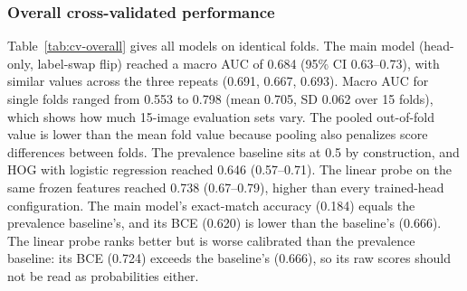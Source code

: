 \documentclass[11pt]{article}
\begin{document}
\subsubsection*{Overall cross-validated performance}
Table~\ref{tab:cv-overall} gives all models on identical folds. The main model (head-only, label-swap flip) reached a macro AUC of 0.684 (95\% CI 0.63--0.73), with similar values across the three repeats (0.691, 0.667, 0.693). Macro AUC for single folds ranged from 0.553 to 0.798 (mean 0.705, SD 0.062 over 15 folds), which shows how much 15-image evaluation sets vary. The pooled out-of-fold value is lower than the mean fold value because pooling also penalizes score differences between folds. The prevalence baseline sits at 0.5 by construction, and HOG with logistic regression reached 0.646 (0.57--0.71). The linear probe on the same frozen features reached 0.738 (0.67--0.79), higher than every trained-head configuration. The main model's exact-match accuracy (0.184) equals the prevalence baseline's, and its BCE (0.620) is lower than the baseline's (0.666). The linear probe ranks better but is worse calibrated than the prevalence baseline: its BCE (0.724) exceeds the baseline's (0.666), so its raw scores should not be read as probabilities either.
\end{document}
